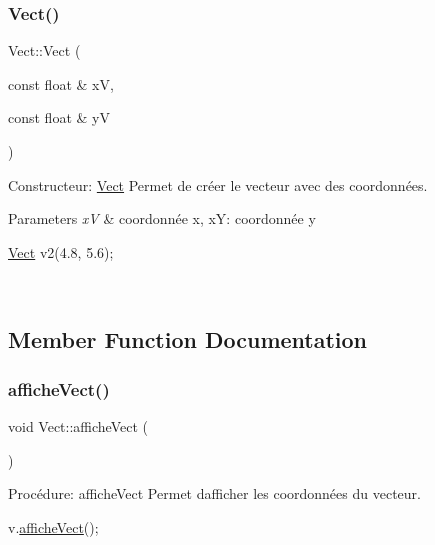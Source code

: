 \subsubsection{\texorpdfstring{Vect()}{Vect()}\hspace{0.1cm}{\footnotesize\ttfamily [3/3]}}
{\footnotesize\ttfamily Vect\+::\+Vect (\begin{DoxyParamCaption}\item[{const float \&}]{xV,  }\item[{const float \&}]{yV }\end{DoxyParamCaption})}



Constructeur\+: \hyperlink{classVect}{Vect} Permet de créer le vecteur avec des coordonnées. 


\begin{DoxyParams}{Parameters}
{\em xV} & coordonnée x, xY\+: coordonnée y 
\begin{DoxyCode}
\hyperlink{classVect}{Vect} v2(4.8, 5.6);
\end{DoxyCode}
 \\
\hline
\end{DoxyParams}


\subsection{Member Function Documentation}
\mbox{\label{classVect_afba6ce27d6700dddeb9272cdf39c66e3}} 
\subsubsection{\texorpdfstring{affiche\+Vect()}{afficheVect()}}
{\footnotesize\ttfamily void Vect\+::affiche\+Vect (\begin{DoxyParamCaption}{ }\end{DoxyParamCaption})}



Procédure\+: affiche\+Vect Permet d\textquotesingle{}afficher les coordonnées du vecteur. 


\begin{DoxyCode}
v.\hyperlink{classVect_afba6ce27d6700dddeb9272cdf39c66e3}{afficheVect}();
\end{DoxyCode}
 \mbox{\label{classVect_a8925192fe8666b52b2385ff006ab3213}} 
